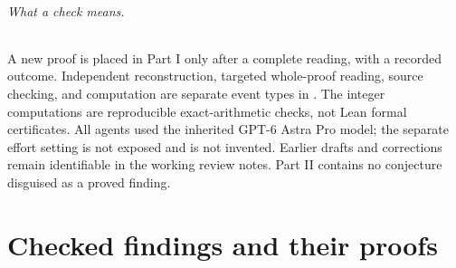 \documentclass[11pt,a4paper]{article}
\theoremstyle{definition}
\theoremstyle{remark}
\begin{document}
\paragraph{What a check means.}
A new proof is placed in Part I only after a complete reading,
with a recorded outcome. Independent reconstruction, targeted
whole-proof reading, source checking, and computation are separate
event types in . The integer computations
are reproducible exact-arithmetic checks, not Lean formal
certificates. All agents used the inherited GPT-6 Astra Pro model;
the separate effort setting is not exposed and is not invented.
Earlier drafts and corrections remain identifiable in the working
review notes. Part II contains no conjecture disguised as a proved
finding.

\part{Checked findings and their proofs}
\end{document}
